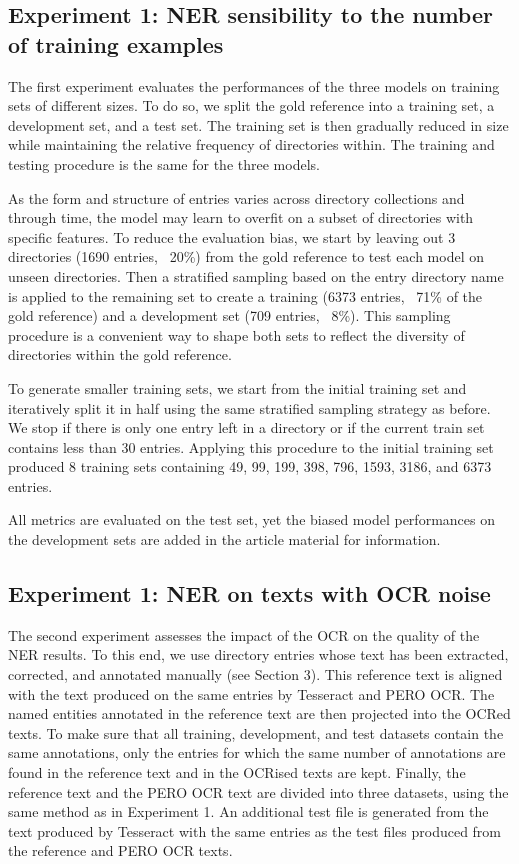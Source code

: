 \subsection{Experiment 1: NER sensibility to the number of training examples}
\label{subsection:experiment-1}
The first experiment evaluates the performances of the three models on training sets of different sizes.
To do so, we split the gold reference into a training set, a development set, and a test set. The training set is then gradually reduced in size while maintaining the relative frequency of directories within.
The training and testing procedure is the same for the three models.

As the form and structure of entries varies across directory collections and through time, the model may learn to overfit on a subset of directories with specific features.
To reduce the evaluation bias, we start by leaving out 3 directories (1690 entries, ~20\%) from the gold reference to test each model on unseen directories.
Then a stratified sampling based on the entry directory name is applied to the remaining set to create a training (6373 entries, ~71\% of the gold reference) and a development set (709 entries, ~8\%).
This sampling procedure is a convenient way to shape both sets to reflect the diversity of directories within the gold reference.

To generate smaller training sets, we start from the initial training set and iteratively split it in half using the same stratified sampling strategy as before.
We stop if there is only one entry left in a directory or if the current train set contains less than 30 entries.
Applying this procedure to the initial training set produced 8 training sets containing 49, 99, 199, 398, 796, 1593, 3186, and 6373 entries.

All metrics are evaluated on the test set, yet the biased model performances on the development sets are added in the article material for information.





\subsection{Experiment 1: NER on texts with OCR noise}
\label{subsection:experiment-2}
The second experiment assesses the impact of the OCR on the quality of the NER results. To this end, we use directory entries whose text has been extracted, corrected, and annotated manually (see Section 3). This reference text is aligned with the text produced on the same entries by Tesseract and PERO OCR. The named entities annotated in the reference text are then projected into the OCRed texts. To make sure that all training, development, and test datasets contain the same annotations, only the entries for which the same number of annotations are found in the reference text and in the OCRised texts are kept. Finally, the reference text and the PERO OCR text are divided into three datasets, using the same method as in Experiment 1. An additional test file is generated from the text produced by Tesseract with the same entries as the test files produced from the reference and PERO OCR texts.




